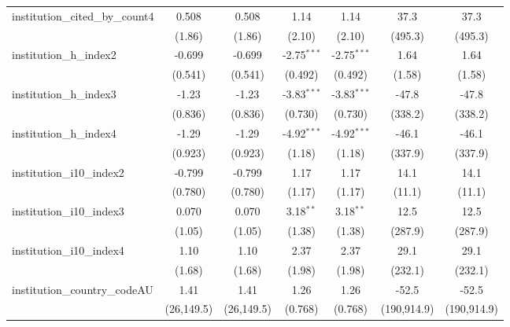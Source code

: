 \begin{tabular}{lcccccc}
   institution\_cited\_by\_count4        & 0.508        & 0.508        & 1.14          & 1.14          & 37.3        & 37.3\\   
                                         & (1.86)       & (1.86)       & (2.10)        & (2.10)        & (495.3)     & (495.3)\\   
   institution\_h\_index2                & -0.699       & -0.699       & -2.75$^{***}$ & -2.75$^{***}$ & 1.64        & 1.64\\   
                                         & (0.541)      & (0.541)      & (0.492)       & (0.492)       & (1.58)      & (1.58)\\   
   institution\_h\_index3                & -1.23        & -1.23        & -3.83$^{***}$ & -3.83$^{***}$ & -47.8       & -47.8\\   
                                         & (0.836)      & (0.836)      & (0.730)       & (0.730)       & (338.2)     & (338.2)\\   
   institution\_h\_index4                & -1.29        & -1.29        & -4.92$^{***}$ & -4.92$^{***}$ & -46.1       & -46.1\\   
                                         & (0.923)      & (0.923)      & (1.18)        & (1.18)        & (337.9)     & (337.9)\\   
   institution\_i10\_index2              & -0.799       & -0.799       & 1.17          & 1.17          & 14.1        & 14.1\\   
                                         & (0.780)      & (0.780)      & (1.17)        & (1.17)        & (11.1)      & (11.1)\\   
   institution\_i10\_index3              & 0.070        & 0.070        & 3.18$^{**}$   & 3.18$^{**}$   & 12.5        & 12.5\\   
                                         & (1.05)       & (1.05)       & (1.38)        & (1.38)        & (287.9)     & (287.9)\\   
   institution\_i10\_index4              & 1.10         & 1.10         & 2.37          & 2.37          & 29.1        & 29.1\\   
                                         & (1.68)       & (1.68)       & (1.98)        & (1.98)        & (232.1)     & (232.1)\\   
   institution\_country\_codeAU          & 1.41         & 1.41         & 1.26          & 1.26          & -52.5       & -52.5\\   
                                         & (26,149.5)   & (26,149.5)   & (0.768)       & (0.768)       & (190,914.9) & (190,914.9)\\   

\end{tabular}
